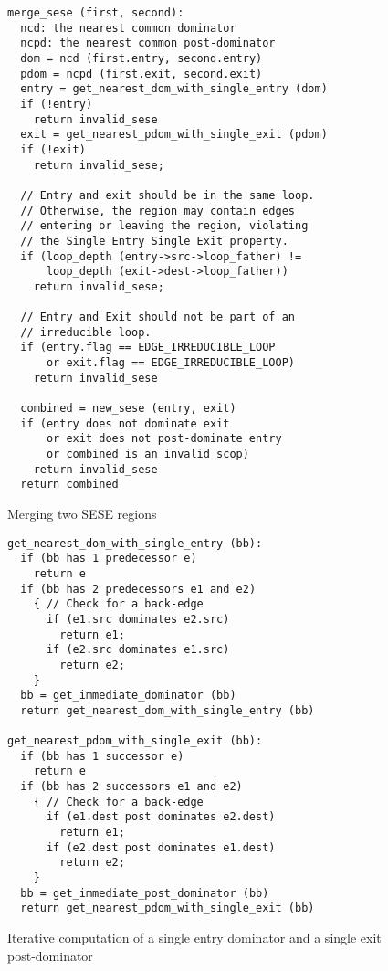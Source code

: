 \documentclass{sig-alternate}
\begin{document}
\begin{figure}
\begin{verbatim}
merge_sese (first, second):
  ncd: the nearest common dominator
  ncpd: the nearest common post-dominator
  dom = ncd (first.entry, second.entry)
  pdom = ncpd (first.exit, second.exit)
  entry = get_nearest_dom_with_single_entry (dom)
  if (!entry)
    return invalid_sese
  exit = get_nearest_pdom_with_single_exit (pdom)
  if (!exit)
    return invalid_sese;

  // Entry and exit should be in the same loop.
  // Otherwise, the region may contain edges
  // entering or leaving the region, violating
  // the Single Entry Single Exit property.
  if (loop_depth (entry->src->loop_father) !=
      loop_depth (exit->dest->loop_father))
    return invalid_sese;

  // Entry and Exit should not be part of an
  // irreducible loop.
  if (entry.flag == EDGE_IRREDUCIBLE_LOOP
      or exit.flag == EDGE_IRREDUCIBLE_LOOP)
    return invalid_sese

  combined = new_sese (entry, exit)
  if (entry does not dominate exit
      or exit does not post-dominate entry
      or combined is an invalid scop)
    return invalid_sese
  return combined
\end{verbatim}
\caption{Merging two SESE regions}
\label{fig:merge-sese}
\end{figure}


\begin{figure}
\begin{verbatim}
get_nearest_dom_with_single_entry (bb):
  if (bb has 1 predecessor e)
    return e
  if (bb has 2 predecessors e1 and e2)
    { // Check for a back-edge
      if (e1.src dominates e2.src)
        return e1;
      if (e2.src dominates e1.src)
        return e2;
    }
  bb = get_immediate_dominator (bb)
  return get_nearest_dom_with_single_entry (bb)

get_nearest_pdom_with_single_exit (bb):
  if (bb has 1 successor e)
    return e
  if (bb has 2 successors e1 and e2)
    { // Check for a back-edge
      if (e1.dest post dominates e2.dest)
        return e1;
      if (e2.dest post dominates e1.dest)
        return e2;
    }
  bb = get_immediate_post_dominator (bb)
  return get_nearest_pdom_with_single_exit (bb)
\end{verbatim}
\caption{Iterative computation of a single entry dominator and a single exit
  post-dominator}
\label{fig:iterate-single-entry}
\end{figure}
\end{document}
